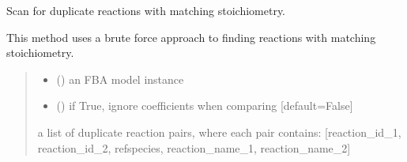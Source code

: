 \documentclass[letterpaper,12pt,english]{sphinxmanual}
\begin{document}
\begin{fulllineitems}
\label{\detokenize{api/core:cbmpy.CBTools.scanForReactionDuplicates}}
\pysigstartsignatures
\pysiglinewithargsret
{}
{\sphinxparamcomma {}}
{}
\pysigstopsignatures
\sphinxAtStartPar
Scan for duplicate reactions with matching stoichiometry.

\sphinxAtStartPar
This method uses a brute force approach to finding reactions with matching
stoichiometry.
\begin{quote}\begin{description}
\begin{itemize}
\item {} 
\sphinxAtStartPar
{} () \textendash{} an FBA model instance

\item {} 
\sphinxAtStartPar
{} (\sphinxstyleliteralemphasis{\sphinxupquote{, }}) \textendash{} if True, ignore coefficients when comparing {[}default=False{]}

\end{itemize}

\sphinxAtStartPar
{} \textendash{} a list of duplicate reaction pairs, where each pair contains:
{[}reaction\_id\_1, reaction\_id\_2, refspecies, reaction\_name\_1, reaction\_name\_2{]}

\end{description}\end{quote}

\end{fulllineitems}

\end{document}
